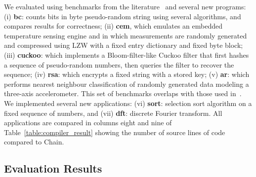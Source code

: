 We evaluated \sys using benchmarks from the literature~\cite{chain,alpaca} and
several new programs: (i) \textbf{bc}: counts bits in byte pseudo-random string
using several algorithms, and compares results for correctness; (ii)
\textbf{cem}, which emulates an embedded temperature sensing engine and in
which measurements are randomly generated and compressed using LZW with a fixed
entry dictionary and fixed byte block; (iii) \textbf{cuckoo}: which implements
a Bloom-filter-like Cuckoo filter that first hashes a sequence of pseudo-random
numbers, then queries the filter to recover the sequence; (iv) \textbf{rsa}:
which encrypts a fixed string with a stored key; (v) \textbf{ar}: which
performs nearest neighbour classification of randomly generated data modeling a
three-axis accelerometer.  This set of benchmarks overlaps with those used
in~\cite{chain,alpaca}. We implemented several new applications: (vi)
\textbf{sort}: selection sort algorithm on a fixed sequence of numbers, and
(vii) \textbf{dft}: discrete Fourier transform. All applications are compared
in columns eight and nine of Table~\ref{table:compiler_result} showing the
number of source lines of code compared to Chain.


\subsection{\sys Evaluation Results}
\label{sec:results_evaluation}

